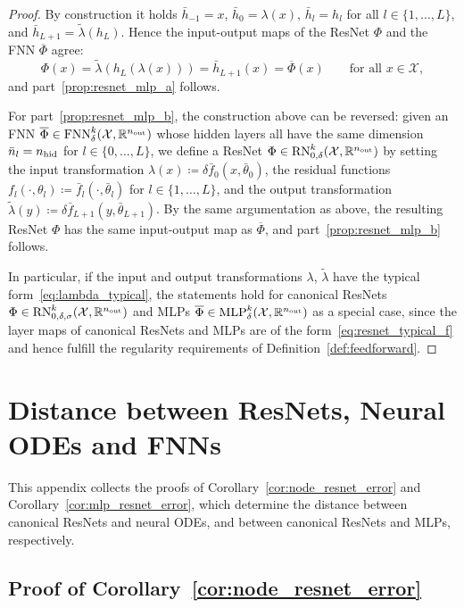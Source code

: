 \documentclass[10pt]{article}
\theoremstyle{definition}
\numberwithin{equation}{section}
\newcommand{\R}{\mathbb{R}}
\newcommand*{\nout}{n_\textup{out}}
\newcommand*{\nhid}{n_\textup{hid}}
\newcommand*{\MLP}{\textup{MLP}_{\delta}^k(\mathcal{X},\R^{\nout})}
\newcommand*{\FNN}{\textup{FNN}_{\delta}^k(\mathcal{X},\R^{\nout})}
\begin{document}
\begin{proof}
    By construction it holds $\bar{h}_{-1} = x$, $\bar{h}_0 = \lambda(x)$, $\bar{h}_l = h_l$ for all $l \in \{1,\ldots,L\}$, and $\bar{h}_{L+1} = \tilde{\lambda}(h_L)$. Hence the input-output maps of the ResNet $\Phi$ and the FNN $\overline{\Phi}$ agree:
    \begin{equation*}
        \Phi(x) = \tilde{\lambda}(h_L(\lambda(x))) = \bar{h}_{L+1}(x) = \overline{\Phi}(x) \qquad \text{for all } x \in \mathcal{X},
    \end{equation*}
    and part~\ref{prop:resnet_mlp_a} follows.
    
    For part~\ref{prop:resnet_mlp_b}, the construction above can be reversed: given an FNN $\overline{\Phi} \in \FNN$ whose hidden layers all have the same dimension $\bar{n}_l = \nhid$ for $l \in \{0,\ldots,L\}$, we define a ResNet $\Phi \in \textup{RN}_{0,\delta}^k(\mathcal{X},\R^{\nout})$ by setting the input transformation $\lambda(x) \coloneqq \delta \bar{f}_0(x,\bar{\theta}_0)$, the residual functions $f_l(\cdot,\theta_l) \coloneqq \bar{f}_l(\cdot,\bar{\theta}_l)$ for $l \in \{1,\ldots,L\}$, and the output transformation $\tilde{\lambda}(y) \coloneqq \delta \bar{f}_{L+1}(y,\bar{\theta}_{L+1})$. By the same argumentation as above, the resulting ResNet $\Phi$ has the same input-output map as $\overline{\Phi}$, and part~\ref{prop:resnet_mlp_b} follows.

    In particular, if the input and output transformations $\lambda$, $\tilde{\lambda}$ have the typical form~\eqref{eq:lambda_typical}, the statements hold for canonical ResNets $\Phi \in \textup{RN}_{0,\delta,\sigma}^k(\mathcal{X},\R^{\nout})$ and MLPs $\overline{\Phi}\in\MLP$ as a special case, since the layer maps of canonical ResNets and MLPs are of the form~\eqref{eq:resnet_typical_f} and hence fulfill the regularity requirements of Definition~\ref{def:feedforward}.
\end{proof}

	

	
    \section{Distance between ResNets, Neural ODEs and FNNs}
    \label{app:distance}

    This appendix collects the proofs of Corollary~\ref{cor:node_resnet_error} and Corollary~\ref{cor:mlp_resnet_error}, which determine the distance between canonical ResNets and neural ODEs, and between canonical ResNets and MLPs, respectively.

    \subsection{Proof of Corollary~\ref{cor:node_resnet_error}}
    \label{app:cor_proof_resnet_neuralODE}
    
\end{document}
